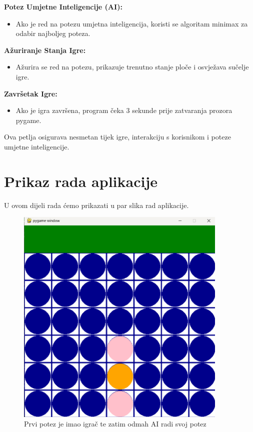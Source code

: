 \documentclass[]{foi}
\begin{document}
\textbf{Potez Umjetne Inteligencije (AI):}
\begin{itemize}
    \item Ako je red na potezu umjetna inteligencija, koristi se algoritam minimax za odabir najboljeg poteza.
\end{itemize}

\textbf{Ažuriranje Stanja Igre:}
\begin{itemize}
    \item Ažurira se red na potezu, prikazuje trenutno stanje ploče i osvježava sučelje igre.
\end{itemize}

\textbf{Završetak Igre:}
\begin{itemize}
    \item Ako je igra završena, program čeka 3 sekunde prije zatvaranja prozora pygame.
\end{itemize}

Ova petlja osigurava nesmetan tijek igre, interakciju s korisnikom i poteze umjetne inteligencije.


\chapter{Prikaz rada aplikacije}

U ovom dijeli rada ćemo prikazati u par slika rad aplikacije.

\begin{figure}[]
    \centering
    \includegraphics[width=0.9\textwidth]{slike/1.png}
    \caption{Prvi potez je imao igrač te zatim odmah AI radi svoj potez}
    \label{Slika1}
\end{figure}
\end{document}
